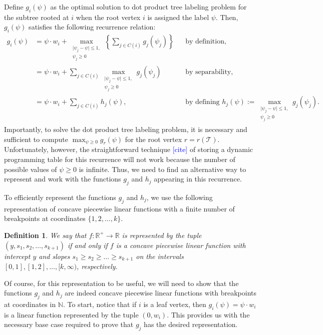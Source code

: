 \documentclass[10pt]{article}
\newtheorem{definition}{Definition}
\newcommand{\henri}[1]{\textcolor{blue}{[#1]}}
\newcommand{\tree}{\mathcal{T}}
\begin{document}
Define $g_{i}(\psi)$ as the optimal solution to dot product tree labeling problem for the subtree rooted at $i$
when the root vertex $i$ is assigned the label $\psi$. Then, $g_{i}(\psi)$ satisfies the following recurrence relation:
\begin{align}
    g_{i}(\psi) &= \psi\cdot w_i + \max_{\substack{\lvert \psi_j - \psi \rvert \leq 1,\\\psi_j \geq 0}} \left\{\sum_{j \in C(i)} g_{j}(\psi_j)\right\} &&\text{by definition,} \nonumber\\
                &= \psi\cdot w_i + \sum_{j \in C(i)}\max_{\substack{\lvert \psi_j - \psi \rvert \leq 1,\\\psi_j \geq 0}} g_{j}(\psi_j) &&\text{by separability,} \nonumber\\
                &= \psi\cdot w_i + \sum_{j \in C(i)}h_j(\psi), &&\text{by defining } h_j(\psi) := \max_{\substack{\lvert \psi_j - \psi \rvert \leq 1,\\\psi_j \geq 0}} g_{j}(\psi_j).
\end{align}
Importantly, to solve the dot product tree labeling problem, it is necessary and sufficient 
to compute $\max_{\psi \geq 0}g_r(\psi)$ for the root vertex $r = r(\tree)$. Unfortunately, however,
the straightforward technique \henri{cite} of storing a dynamic programming table for this recurrence will not
work because the number of possible values of $\psi \geq 0$ is infinite. Thus, we need to find an alternative way to
represent and work with the functions $g_j$ and $h_j$ appearing in this recurrence.

To efficiently represent the functions $g_j$ and $h_j$, we use the
following representation of concave piecewise linear functions with
a finite number of breakpoints at coordinates $\{1, 2, \ldots, k\}$. 
\begin{definition}
    \label{def:g_form}
    We say that $f : \mathbb{R}^+ \rightarrow \mathbb{R}$ 
    is \emph{represented by the tuple} $(y, s_1, s_2, \ldots, s_{k + 1})$ if and only if $f$ is
    a concave piecewise linear function with intercept $y$ and 
    slopes $s_1 \geq s_2 \geq \ldots \geq s_{k + 1}$ on the intervals $[0, 1], [1, 2], \ldots, [k, \infty)$, respectively. 
\end{definition}
Of course, for this representation
to be useful, we will need to show that the functions $g_j$ and $h_j$ are indeed concave 
piecewise linear functions with breakpoints at coordinates in $\mathbb{N}$. 
To start, notice that if $i$ is a leaf vertex, then $g_{i}(\psi) = \psi\cdot w_i$ is 
a linear function represented by the tuple $(0, w_i)$. This provides us with the  
necessary base case required to prove that $g_j$ has the desired representation.
\end{document}
